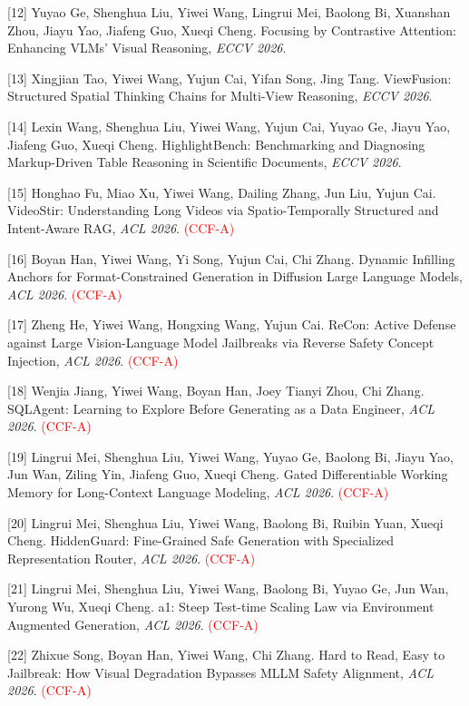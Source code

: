[12] Yuyao Ge, Shenghua Liu, Yiwei Wang, Lingrui Mei, Baolong Bi, Xuanshan Zhou, Jiayu Yao, Jiafeng Guo, Xueqi Cheng. Focusing by Contrastive Attention: Enhancing {VLMs}' Visual Reasoning, \textit{ECCV 2026}.

[13] Xingjian Tao, Yiwei Wang, Yujun Cai, Yifan Song, Jing Tang. {ViewFusion}: Structured Spatial Thinking Chains for Multi-View Reasoning, \textit{ECCV 2026}.

[14] Lexin Wang, Shenghua Liu, Yiwei Wang, Yujun Cai, Yuyao Ge, Jiayu Yao, Jiafeng Guo, Xueqi Cheng. {HighlightBench}: Benchmarking and Diagnosing Markup-Driven Table Reasoning in Scientific Documents, \textit{ECCV 2026}.

[15] Honghao Fu, Miao Xu, Yiwei Wang, Dailing Zhang, Jun Liu, Yujun Cai. VideoStir: Understanding Long Videos via Spatio-Temporally Structured and Intent-Aware RAG, \textit{ACL 2026}. \textcolor{red}{(CCF-A)}

[16] Boyan Han, Yiwei Wang, Yi Song, Yujun Cai, Chi Zhang. Dynamic Infilling Anchors for Format-Constrained Generation in Diffusion Large Language Models, \textit{ACL 2026}. \textcolor{red}{(CCF-A)}

[17] Zheng He, Yiwei Wang, Hongxing Wang, Yujun Cai. ReCon: Active Defense against Large Vision-Language Model Jailbreaks via Reverse Safety Concept Injection, \textit{ACL 2026}. \textcolor{red}{(CCF-A)}

[18] Wenjia Jiang, Yiwei Wang, Boyan Han, Joey Tianyi Zhou, Chi Zhang. SQLAgent: Learning to Explore Before Generating as a Data Engineer, \textit{ACL 2026}. \textcolor{red}{(CCF-A)}

[19] Lingrui Mei, Shenghua Liu, Yiwei Wang, Yuyao Ge, Baolong Bi, Jiayu Yao, Jun Wan, Ziling Yin, Jiafeng Guo, Xueqi Cheng. Gated Differentiable Working Memory for Long-Context Language Modeling, \textit{ACL 2026}. \textcolor{red}{(CCF-A)}

[20] Lingrui Mei, Shenghua Liu, Yiwei Wang, Baolong Bi, Ruibin Yuan, Xueqi Cheng. HiddenGuard: Fine-Grained Safe Generation with Specialized Representation Router, \textit{ACL 2026}. \textcolor{red}{(CCF-A)}

[21] Lingrui Mei, Shenghua Liu, Yiwei Wang, Baolong Bi, Yuyao Ge, Jun Wan, Yurong Wu, Xueqi Cheng. a1: Steep Test-time Scaling Law via Environment Augmented Generation, \textit{ACL 2026}. \textcolor{red}{(CCF-A)}

[22] Zhixue Song, Boyan Han, Yiwei Wang, Chi Zhang. Hard to Read, Easy to Jailbreak: How Visual Degradation Bypasses MLLM Safety Alignment, \textit{ACL 2026}. \textcolor{red}{(CCF-A)}

